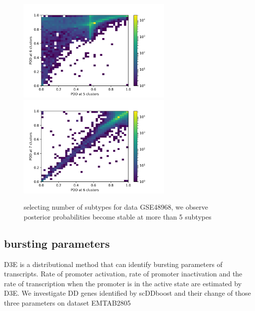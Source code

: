 \documentclass[11pt]{amsart}
\begin{document}
\begin{figure}[H]
  \includegraphics[height = 5cm, width=\linewidth]{G48_56.png}
\endminipage\hfill
{}
  \includegraphics[height = 5cm, width=\linewidth]{G48_67.png}
\endminipage\hfill
\caption{selecting number of subtypes for data GSE48968, we observe posterior probabilities become stable at more than 5 subtypes}
\end{figure}

\subsection{bursting parameters}
D3E\cite{ref:d3e} is a distributional method that can identify bursting parameters of transcripts. Rate of promoter activation, rate of promoter inactivation and the rate of transcription when the promoter is in the active state are estimated by D3E.  We investigate DD genes identified by scDDboost and their change of those three parameters on dataset EMTAB2805\\
\end{document}
